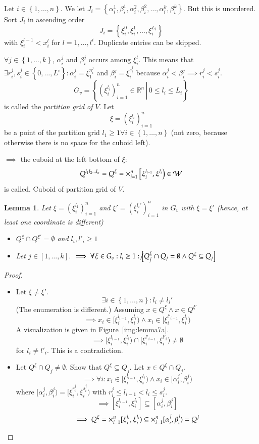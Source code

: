 \documentclass{article}
\newtheorem{lemma}{Lemma}  \numberwithin{lemma}{section}
\newcommand{\set}[1]{\left\{#1\right\}}
\newcommand{\setdef}[2]{\left\{\left.#1\,\right|\,#2\right\}}
\begin{document}
Let $i \in \set{1,\ldots,n}$.
We let $J_i = \set{\alpha_i^1, \beta_i^1, \alpha_i^2, \beta_i^2, \ldots, \alpha_i^k, \beta_i^k}$.
But this is unordered. Sort $J_i$ in ascending order
\[ J_i = \set{\xi_i^0, \xi_i^1, \ldots, \xi_i^{L_i}} \]
with $\xi_i^{l-1} < x_i^l$ for $l = 1, \ldots, l^i$.
Duplicate entries can be skipped.

$\forall j \in \set{1,\ldots,k}$, $\alpha_i^j$ and $\beta_i^j$ occurs among $\xi_i^l$.
This means that $\exists r_i^j, s_i^j \in \set{0, \ldots, L^i}: \alpha_i^j = \xi_1^{n_i^j}$ and $\beta_i^j = \xi_i^{s_i^j}$
because $\alpha_i^j < \beta_i^j \implies r_i^j < s_i^j$.
\[ G_v = \setdef{(\xi_i^{l_i})_{i=1}^n \in \mathbb R^n}{0 \leq l_i \leq L_i} \]
is called the \emph{partition grid of $V$}. Let
\[ \xi = (\xi_i^{l_i})_{i=1}^n \]
be a point of the partition grid
$l_1 \geq 1 \forall i \in \set{1,\ldots,n}$ (not zero, because otherwise there is no space for the cuboid left).

$\implies$ the cuboid at the left bottom of $\xi$:
\[ Q^{l_1 l_2 \ldots l_n} = Q^\xi = \huge\times_{i=1}^n \left[\xi_i^{l_{i-1}}, \xi^{l_i}\right) \in \mathcal W \]
is called. Cuboid of partition grid of $V$.


\begin{lemma}
  \label{l:seven}
  Let $\xi = (\xi_i^{l_1})_{i=1}^n$ and $\xi' = (\xi_i^{l_i'})_{i=1}^n$ in $G_v$ with $\xi = \xi'$ (hence, at least one coordinate is different)
  \begin{itemize}
    \item $Q^\xi \cap Q^{\xi'} = \emptyset$ and $l_i, l'_i \geq 1$
    \item Let $j \in [1,\ldots,k]$. $\implies \forall \xi \in G_v: l_i \geq 1: \not\left[Q_j^\xi \cap Q_j = \emptyset \land Q^\xi \subseteq Q_j\right]$
  \end{itemize}
\end{lemma}
\begin{proof}
  \begin{itemize}
    \item
      Let $\xi \neq \xi'$.
      \[ \exists i \in \set{1,\ldots,n}: l_i \neq l_i' \]
      (The enumeration is different.) Assuming $x \in Q^\xi \land x \in Q^{\xi'}$
      \[ \implies x_i \in [\xi_i^{l_{i-1}}, \xi_i^{l_i}) \land x_i \in [\xi_i^{l'_{i-1}}, \xi_i^{l_i}) \]
      A visualization is given in Figure~\ref{img:lemma7a}.
      \[ \implies [\xi_i^{l_{i-1}}, \xi_i^{l_i}) \cap [\xi_i^{l'_{i-1}}, \xi_i^{l'_i}) \neq \emptyset \]
      for $l_i \neq l'_i$. This is a contradiction.
    \item
      Let $Q^\xi \cap Q_j \neq \emptyset$. Show that $Q^\xi \subseteq Q_j$.
      Let $x \in Q^\xi \cap Q_j$.
      \[ \implies \forall i: x_i \in [\xi_{i}^{l_{i-1}}, \xi_i^{l_i}) \land x_i \in [\alpha_i^j, \beta_i^j) \]
      where $[\alpha_i^j, \beta_i^j) = [\xi_i^{r_i^j}, \xi_i^{s_i^j})$ with $r_i^j \leq l_{i-1} < l_i \leq s_i^j$.
      \[ \implies [\xi_i^{l_{i-1}}, \xi_i^{l_i}] \subseteq [\alpha_i^j, \beta_i^j] \]
      \[ \implies Q^\xi = \huge\times_{i=1}^{n} [\xi_i^{l_i}, \xi_i^{l_i}) \subseteq \huge\times_{i=1}^n [\alpha_i^j, \beta_i^j) = Q^j \]
  \end{itemize}
\end{proof}
\end{document}
